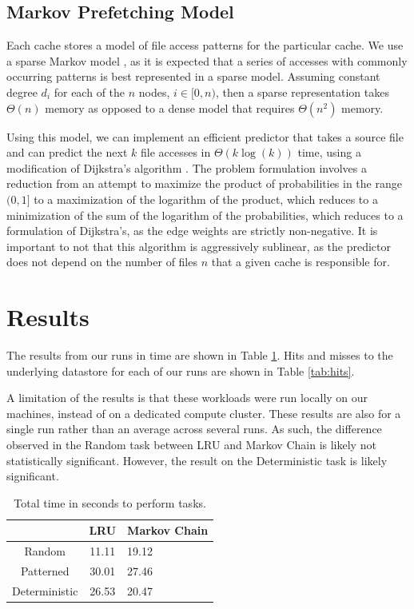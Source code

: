 \documentclass[sigconf]{acmart}
\begin{document}
\subsection{Markov Prefetching Model}
\label{sec:markovchain}
Each cache stores a model of file access patterns for the particular cache. We use a sparse Markov model \cite{xiong2016SparseMarkov}, as it is expected that a series of accesses with commonly occurring patterns is best represented in a sparse model. Assuming constant degree $d_i$ for each of the $n$ nodes, $i \in [0, n)$, then a sparse representation takes $\Theta(n)$ memory as opposed to a dense model that requires $\Theta(n^2)$ memory. 

Using this model, we can implement an efficient predictor that takes a source file and can predict the next $k$ file accesses in $\Theta(k \log(k))$ time, using a modification of Dijkstra's algorithm \cite{dijkstra1959}. The problem formulation involves a reduction from an attempt to maximize the product of probabilities in the range $(0, 1]$ to a maximization of the logarithm of the product, which reduces to a minimization of the sum of the logarithm of the probabilities, which reduces to a formulation of Dijkstra's, as the edge weights are strictly non-negative. It is important to not that this algorithm is aggressively sublinear, as the predictor does not depend on the number of files $n$ that a given cache is responsible for.



\section{Results}
\label{sec:results}
The results from our runs in time are shown in Table \ref{tab:freq}. Hits and misses to the underlying datastore for each of our runs are shown in Table \ref{tab:hits}.

A limitation of the results is that these workloads were run locally on our machines, instead of on a dedicated compute cluster. These results are also for a single run rather than an average across several runs. As such, the difference observed in the Random task between LRU and Markov Chain is likely not statistically significant. However, the result on the Deterministic task is likely significant.

\begin{table}[h]
  \caption{Total time in seconds to perform tasks.}
  \label{tab:freq}
  \begin{tabular}{ccl}
    \toprule
     & LRU  & Markov Chain \\
    \midrule
 Random & 11.11 & 19.12 \\
 Patterned  & 30.01 & 27.46 \\
 Deterministic  & 26.53 & 20.47 \\
  \bottomrule
\end{tabular}
\end{table}
\end{document}
